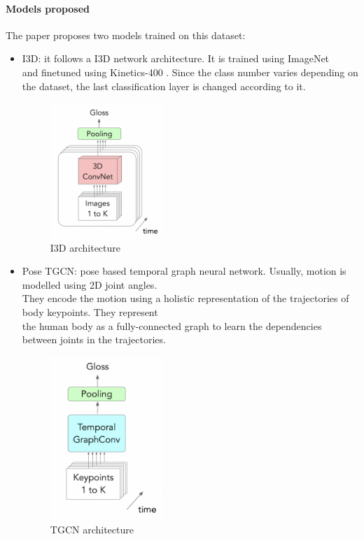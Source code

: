 \paragraph{Models proposed} The paper proposes two models trained on this dataset:
\begin{itemize}[noitemsep]
    \item I3D: it follows a I3D network architecture. It is trained using ImageNet \cite{ImageNet} \\ 
    and finetuned using Kinetics-400 \cite{Kinetics400}. Since the class number varies depending on \\
    the dataset, the last classification layer is changed according to it. \\
    \begin{figure}[H]
        \centering
            \includegraphics[width=0.4\textwidth]{assets/i3d.png}
        \caption{I3D architecture}
        \label{fig:introduction_i3d}
    \end{figure}
    \item Pose TGCN: pose based temporal graph neural network. Usually, motion is modelled using 2D joint angles. \\
    They encode the motion using a holistic representation of the trajectories of body keypoints. They represent \\
    the human body as a fully-connected graph to learn the dependencies between joints in the trajectories. \\
    \begin{figure}[H]
        \centering
            \includegraphics[width=0.4\textwidth]{assets/tgcn.png}
        \caption{TGCN architecture}
        \label{fig:introduction_tgcn}
    \end{figure}
\end{itemize}

